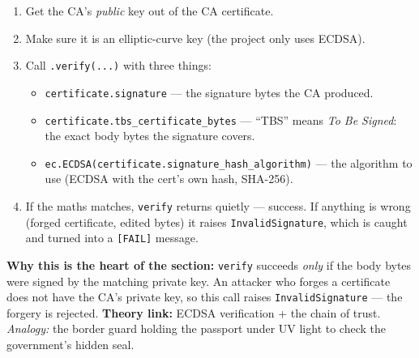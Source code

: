 \documentclass[11pt,a4paper]{article}
\begin{document}
\begin{enumerate}
  \item Get the CA's \emph{public} key out of the CA certificate.
  \item Make sure it is an elliptic-curve key (the project only uses ECDSA).
  \item Call \texttt{.verify(...)} with three things:
        \begin{itemize}
          \item \texttt{certificate.signature} --- the signature bytes the CA produced.
          \item \texttt{certificate.tbs\_certificate\_bytes} --- ``TBS'' means
                \emph{To Be Signed}: the exact body bytes the signature covers.
          \item \texttt{ec.ECDSA(certificate.signature\_hash\_algorithm)} --- the
                algorithm to use (ECDSA with the cert's own hash, SHA-256).
        \end{itemize}
  \item If the maths matches, \texttt{verify} returns quietly --- success.
        If anything is wrong (forged certificate, edited bytes) it raises
        \texttt{InvalidSignature}, which is caught and turned into a
        \texttt{[FAIL]} message.
\end{enumerate}
\textbf{Why this is the heart of the section:} \texttt{verify} succeeds
\emph{only} if the body bytes were signed by the matching private key. An
attacker who forges a certificate does not have the CA's private key, so this
call raises \texttt{InvalidSignature} --- the forgery is rejected.
\textbf{Theory link:} ECDSA verification + the chain of trust. \emph{Analogy:}
the border guard holding the passport under UV light to check the government's
hidden seal.
\end{document}
